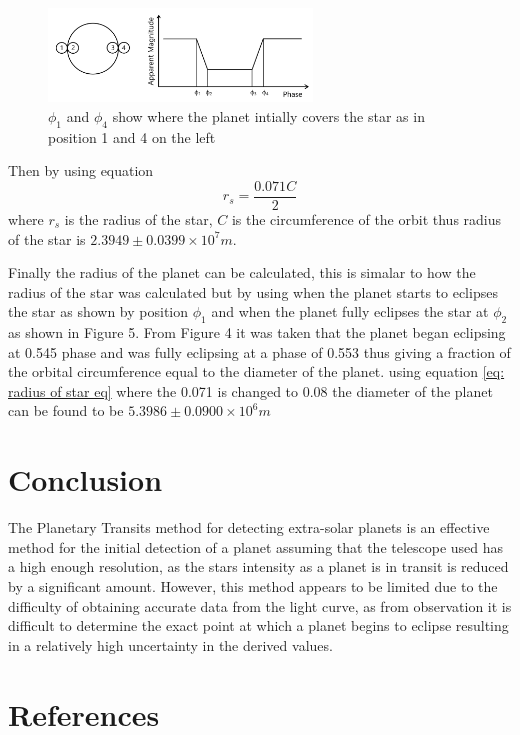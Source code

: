 \documentclass[]{article}
\begin{document}
\begin{figure}[h]
  \includegraphics[width=7cm]{images/planet transit of star.png}
  \caption{$\phi_1 $ and $\phi_4$ show where the planet intially covers
   the star as in position 1 and 4 on the left}
  \label{fig:HD-_init}
  \end{figure}

Then by using equation 
\begin{equation}\label{eq: radius of star eq}
  r_s = \frac{0.071C}{2}
  \end{equation}
where $r_s$ is the radius of the star, $C$ is the circumference of the orbit
thus radius of the star is $2.3949\pm0.0399\times10^7m $.
\par
Finally the radius of the planet can be calculated, this is 
simalar to how the radius of the star was calculated but 
by using when the planet starts to eclipses the star as shown by 
position $\phi_1$ and when the planet fully eclipses the star
at $\phi_2$ as shown in Figure 5.
From Figure 4 it was taken that the planet began eclipsing at 0.545 phase
and was fully eclipsing at a phase of 0.553 thus giving a fraction 
of the orbital circumference equal to the diameter of the planet.
using equation \ref{eq: radius of star eq} where the 0.071 is changed 
to 0.08 the diameter of the planet can be found to be $5.3986\pm 0.0900\times10^6m $
\section*{Conclusion}

The Planetary Transits method for detecting extra-solar planets
is an effective method for the initial detection of a planet
assuming that the telescope used has a high enough resolution,  
as the stars intensity as a planet is in transit is reduced by a
significant amount. However, this method appears to be limited due 
to the difficulty of obtaining accurate data from the light curve, 
as from observation it is difficult to determine the exact point 
at which a planet begins to eclipse resulting in a relatively high
uncertainty in the derived values.




\newpage
\onecolumn
\section*{References}
\end{document}
